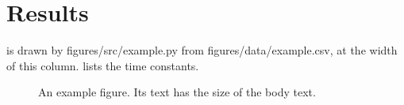 \section{Results}\label{sec:results}
 is drawn by figures/src/example.py from figures/data/example.csv, at the width of this column.
 lists the time constants.
\begin{figure}[!htb]
  \centering
  \caption{An example figure. Its text has the size of the body text.}
  \label{fig:example}
\end{figure}
\begin{table}[!htb]
  \centering
  \caption{An example table, short in the conference version.}
  \label{tab:example}
\end{table}
